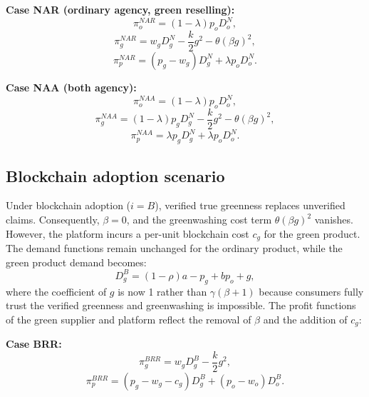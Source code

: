 \documentclass[preprint,review,12pt,authoryear,nopreprintline]{elsarticle}
\theoremstyle{definition}
\begin{document}
\noindent\textbf{Case NAR (ordinary agency, green reselling):}
\begin{equation}  \label{eq:profit-AR}
\pi_o^{NAR}=(1-\lambda)p_oD_o^N,
\end{equation}
\begin{equation}
\pi_g^{NAR}=w_gD_g^N-\frac{k}{2}g^2-\theta (\beta g)^2,
\end{equation}
\begin{equation}
\pi_p^{NAR}=(p_g-w_g)D_g^N+\lambda p_oD_o^N.
\end{equation}

\noindent\textbf{Case NAA (both agency):}
\begin{equation}  \label{eq:profit-AA}
\pi_o^{NAA}=(1-\lambda)p_oD_o^N,
\end{equation}
\begin{equation}
\pi_g^{NAA}=(1-\lambda)p_gD_g^N-\frac{k}{2}g^2-\theta (\beta g)^2,
\end{equation}
\begin{equation}
\pi_p^{NAA}=\lambda p_gD_g^N+\lambda p_oD_o^N.
\end{equation}

\subsection{Blockchain adoption scenario}

Under blockchain adoption ($i = B$), verified true greenness replaces unverified claims. Consequently, $\beta = 0$, and the greenwashing cost term $\theta(\beta g)^2$ vanishes. However, the platform incurs a per-unit blockchain cost $c_g$ for the green product. The demand functions remain unchanged for the ordinary product, while the green product demand becomes:
\begin{equation}
D_g^{B}=(1-\rho)a-p_g+bp_o+g,
\end{equation}
where the coefficient of $g$ is now 1 rather than $\gamma(\beta+1)$ because consumers fully trust the verified greenness and greenwashing is impossible. The profit functions of the green supplier and platform reflect the removal of $\beta$ and the addition of $c_g$:

\noindent\textbf{Case BRR:}
\begin{equation}
\pi_g^{BRR}=w_g D_g^B-\frac{k}{2}g^2,
\end{equation}
\begin{equation}
\pi_p^{BRR}=(p_g-w_g-c_g)D_g^B+(p_o-w_o)D_o^B.
\end{equation}
\end{document}
